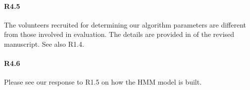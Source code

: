 \paragraph{R4.5} The volunteers recruited for determining our algorithm parameters are different from those involved in
 evaluation. The details are provided in  of the revised manuscript. See also R1.4.

 \paragraph{R4.6} Please see our response to R1.5 on how the HMM model is built.
